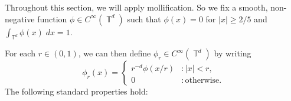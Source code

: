 \documentclass[dvipsnames,letterpaper,12pt]{article}
\numberwithin{equation}{section}
\DeclareMathOperator{\TT}{\mathbb{T}}
\newtheorem{theorem}{Theorem}
\numberwithin{theorem}{section}
\begin{document}
%

Throughout this section, we will apply mollification. So we fix a smooth, non-negative function $\phi \in C^\infty(\TT^d)$ such that $\phi(x) = 0$ for $|x| \geq 2/5$ and $\int_{\TT^d} \phi(x)\; dx = 1$.
%
\begin{comment}
\begin{theorem} \label{equationASFGCISIX}
    There exists a smooth probability density $\phi \in C^\infty(\TT^d)$ such that $\phi(x) = 0$ for $|x| \geq 2/5$, and such that for each $x \in \TT^d$
    \[ \sum_{k \in \{ 0, 1 \}^d} \phi(x + k/2) = 2^d. \]
\end{theorem}
\begin{proof}
    Let $\psi$ be a non-negative smooth function on $\TT$ such that $\psi(x) = \psi(- x)$ for all $x \in \TT$, $\psi(x) = 1$ for $|x| \leq 1/10$, $\psi(x) = 0$ for $|x| \geq 2/10$, and $0 \leq \psi(x) \leq 1$ for all $x \in \TT$. Then define $\eta$ to be the non-negative, $C^\infty$ function
    \[ \eta(x) = \frac{1}{2} - \frac{\psi(x) + \psi(x + 1/2)}{2}. \]
    If we define
    \[ \phi_0(x) = 2(\psi(x) + \eta(x)), \]
    then $\phi_0(x) + \phi_0(x + 1/2) = 2$ for all $x \in \TT$. Moreover, if $|x| \geq 2/5$, then $\psi(x) = 0$, and since this implies $|x + 1/2| \leq 1/10$, we find $\eta(x) = 0$. Thus $\phi_0(x) = 0$ for $|x| \geq 2/5$. But the condition $\phi_0(x) + \phi_0(x + 1/2) = 2$ implies that $\phi_0$ is a probability density function. Thus it suffices to define
    \[ \phi(x_1, \dots, x_d) = \phi_0(x_1) \dots \phi_0(x_d). \qedhere \]
\end{proof}
\end{comment}
%
For each $r \in (0,1)$, we can then define $\phi_r \in C^\infty(\TT^d)$ by writing
%
\[ \phi_r(x) = \begin{cases} r^{-d} \phi(x/r) &: |x| < r, \\ 0 &: \text{otherwise}. \end{cases} \]
%
The following standard properties hold:
%
\end{document}
